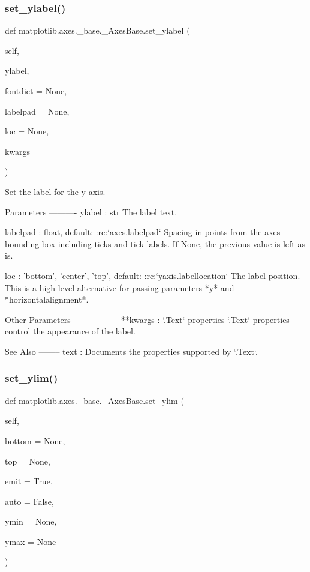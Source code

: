 \subsubsection{\texorpdfstring{set\+\_\+ylabel()}{set\_ylabel()}}
{\footnotesize\ttfamily def matplotlib.\+axes.\+\_\+base.\+\_\+\+Axes\+Base.\+set\+\_\+ylabel (\begin{DoxyParamCaption}\item[{}]{self,  }\item[{}]{ylabel,  }\item[{}]{fontdict = {\ttfamily None},  }\item[{}]{labelpad = {\ttfamily None},  }\item[{}]{loc = {\ttfamily None},  }\item[{}]{kwargs }\end{DoxyParamCaption})}

\begin{DoxyVerb}Set the label for the y-axis.

Parameters
----------
ylabel : str
    The label text.

labelpad : float, default: :rc:`axes.labelpad`
    Spacing in points from the axes bounding box including ticks
    and tick labels.  If None, the previous value is left as is.

loc : {'bottom', 'center', 'top'}, default: :rc:`yaxis.labellocation`
    The label position. This is a high-level alternative for passing
    parameters *y* and *horizontalalignment*.

Other Parameters
----------------
**kwargs : `.Text` properties
    `.Text` properties control the appearance of the label.

See Also
--------
text : Documents the properties supported by `.Text`.
\end{DoxyVerb}
 \mbox{\label{classmatplotlib_1_1axes_1_1__base_1_1__AxesBase_a82df7b21b0e9f47cf6cd454e84ea5414}} 
\subsubsection{\texorpdfstring{set\+\_\+ylim()}{set\_ylim()}}
{\footnotesize\ttfamily def matplotlib.\+axes.\+\_\+base.\+\_\+\+Axes\+Base.\+set\+\_\+ylim (\begin{DoxyParamCaption}\item[{}]{self,  }\item[{}]{bottom = {\ttfamily None},  }\item[{}]{top = {\ttfamily None},  }\item[{}]{emit = {\ttfamily True},  }\item[{}]{auto = {\ttfamily False},  }\item[{}]{ymin = {\ttfamily None},  }\item[{}]{ymax = {\ttfamily None} }\end{DoxyParamCaption})}

